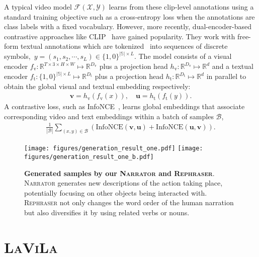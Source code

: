 \documentclass[10pt,twocolumn,letterpaper]{article}
\newcommand{\calX}{\mathcal{X}}
\newcommand{\calY}{\mathcal{Y}}
\newcommand{\ours}{\textsc{LaViLa}\xspace}
\newcommand{\narrator}{\textsc{Narrator}\xspace}
\newcommand{\rephraser}{\textsc{Rephraser}\xspace}
\begin{document}
A typical video model $\mathcal{F} (\calX, \calY)$ learns from these clip-level annotations using a standard training objective such as a cross-entropy loss when the annotations are class labels with a fixed vocabulary. However, more recently, dual-encoder-based contrastive approaches like CLIP~\cite{radford2021clip,xu2021videoclip} have gained popularity.
They work with free-form textual annotations which are tokenized~\cite{sennrich2016bpe} into sequences of discrete symbols,~\ie $ y=(s_1, s_2, \cdots, s_{L})\in \{ 1, 0 \}^{ |\mathbb{S}| \times L } $.
The model consists of a visual encoder $f_\mathrm{v}: \mathbb{R}^{T\times3\times H\times W} \mapsto \mathbb{R}^{D_\mathrm{v}}$ plus a projection head $h_\mathrm{v}: \mathbb{R}^{D_\mathrm{v}} \mapsto \mathbb{R}^{d} $ and a textual encoder $f_\mathrm{t}: \{ 1, 0 \}^{ |\mathbb{S}| \times L } \mapsto \mathbb{R}^{D_\mathrm{t}} $ plus a projection head $ h_\mathrm{t}: \mathbb{R}^{D_\mathrm{t}} \mapsto \mathbb{R}^{d} $ in parallel to obtain the global visual and textual embedding respectively:
{\small
\begin{align*}
	\mathbf{v} = h_\mathrm{v}(f_\mathrm{v}(x)), \quad
	\mathbf{u} = h_\mathrm{t}(f_\mathrm{t}(y)).
\end{align*}
}
A contrastive loss, such as InfoNCE~\cite{oord2018cpc}, learns global embeddings that associate corresponding video and text embeddings within a batch of samples $\mathcal{B}$,
{\small
\begin{align}
	\frac{1}{ |\mathcal{B}| } \sum_{(x,y)\in \mathcal{B}} \left( \mathrm{InfoNCE}(\mathbf{v}, \mathbf{u}) + \mathrm{InfoNCE}(\mathbf{u}, \mathbf{v}) \right).
\end{align}
}


\begin{figure}
	\centering
	\texttt{[image: figures/generation\_result\_one.pdf]}
	\texttt{[image: figures/generation\_result\_one\_b.pdf]}
	\caption{
		\textbf{Generated samples by our \narrator and \rephraser}.
		\narrator generates new descriptions of the action taking place, potentially focusing on other objects being interacted with.
		\rephraser not only changes the word order of the human narration but also diversifies it by using related verbs or nouns.
	}
	\label{fig:qual}
\end{figure}


\section{\ours}
\end{document}
